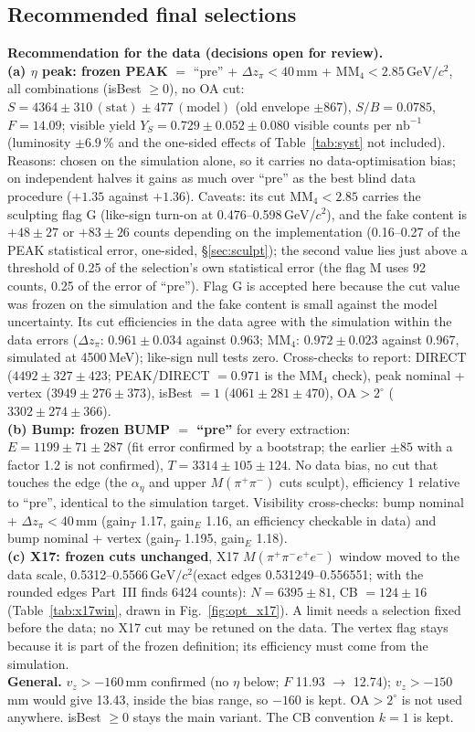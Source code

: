 \documentclass[11pt,a4paper]{article}
\newcommand{\Mfour}{\ensuremath{M(\pi^{+}\pi^{-}e^{+}e^{-})}\xspace}
\newcommand{\Mpipi}{\ensuremath{M(\pi^{+}\pi^{-})}\xspace}
\newcommand{\nbinv}{\ensuremath{\mathrm{nb}^{-1}}\xspace}
\newcommand{\GeVcc}{\ensuremath{\mathrm{GeV}/c^{2}}\xspace}
\newcommand{\MMfour}{\ensuremath{\mathrm{MM}_4}\xspace}
\newcommand{\dzpi}{\ensuremath{\Delta z_\pi}\xspace}
\newcommand{\aeta}{\ensuremath{\alpha_\eta}\xspace}
\newcommand{\vz}{\ensuremath{v_z}\xspace}
\newcommand{\notebox}[1]{\par\noindent\colorbox{orange!10}{\parbox{\dimexpr\linewidth-2\fboxsep\relax}{#1}}\par}
\begin{document}
\subsection{Recommended final selections}
\label{sec:recommend}
\notebox{\textbf{Recommendation for the data (decisions open for review).}\\[0.2em]
\textbf{(a) $\eta$ peak: frozen PEAK} $=$ ``pre'' + $\dzpi<40$\,mm + $\MMfour<2.85$\,\GeVcc, all combinations (isBest $\ge0$), no OA cut:
$S=4364\pm310\,(\mathrm{stat})\pm477\,(\mathrm{model})$ (old envelope $\pm867$), $S/B=0.0785$, $F=14.09$; visible yield
$Y_S=0.729\pm0.052\pm0.080$ visible counts per \nbinv (luminosity $\pm6.9$\,\% and the one-sided effects of Table~\ref{tab:syst} not
included). Reasons: chosen on the simulation alone, so it carries no data-optimisation bias; on independent halves it gains as
much over ``pre'' as the best blind data procedure ($+1.35$ against $+1.36$). Caveats: its cut $\MMfour<2.85$ carries the sculpting
flag G (like-sign turn-on at 0.476--0.598\,\GeVcc), and the fake content is $+48\pm27$ or $+83\pm26$ counts depending on the
implementation (0.16--0.27 of the PEAK statistical error, one-sided, \S\ref{sec:sculpt}); the second value lies just above a threshold of
0.25 of the selection's own statistical error (the flag M uses 92 counts, 0.25 of the error of ``pre''). Flag G
is accepted here because the cut value was frozen on the simulation and the fake content is small against the model uncertainty.
Its cut efficiencies in the data agree with the simulation within the data errors ($\dzpi$: $0.961\pm0.034$ against 0.963;
\MMfour: $0.972\pm0.023$ against 0.967, simulated at 4500\,MeV); like-sign null tests zero. Cross-checks to report: DIRECT
($4492\pm327\pm423$; PEAK/DIRECT $=0.971$ is the \MMfour check), peak nominal + vertex ($3949\pm276\pm373$), isBest $=1$
($4061\pm281\pm470$), OA$>2^\circ$ ($3302\pm274\pm366$).\\[0.2em]
\textbf{(b) Bump: frozen BUMP $=$ ``pre''} for every extraction: $E=1199\pm71\pm287$ (fit error confirmed by a bootstrap; the earlier
$\pm85$ with a factor 1.2 is not confirmed), $T=3314\pm105\pm124$. No data bias, no cut
that touches the edge (the $\aeta$ and upper \Mpipi cuts sculpt), efficiency 1 relative to ``pre'', identical to the simulation
target. Visibility cross-checks: bump nominal + $\dzpi<40$\,mm (gain$_T$ 1.17, gain$_E$ 1.16, an efficiency checkable in data) and
bump nominal + vertex (gain$_T$ 1.195, gain$_E$ 1.18).\\[0.2em]
\textbf{(c) X17: frozen cuts unchanged}, X17 \Mfour window moved to the data scale, 0.5312--0.5566\,\GeVcc (exact edges 0.531249--0.556551; with
the rounded edges Part~III finds 6424 counts): $N=6395\pm81$, CB $=124\pm16$
(Table~\ref{tab:x17win}, drawn in Fig.~\ref{fig:opt_x17}).
A limit needs a selection fixed before the data; no X17 cut may be retuned on the data. The vertex flag stays because it is part of
the frozen definition; its efficiency must come from the simulation.\\[0.2em]
\textbf{General.} $\vz>-160$\,mm confirmed (no $\eta$ below; $F$ 11.93 $\to$ 12.74); $\vz>-150$\,mm would give 13.43, inside the bias range,
so $-160$ is kept. OA$>2^\circ$ is not used anywhere. isBest $\ge0$ stays the main variant. The CB convention $k=1$ is kept.}
\end{document}
